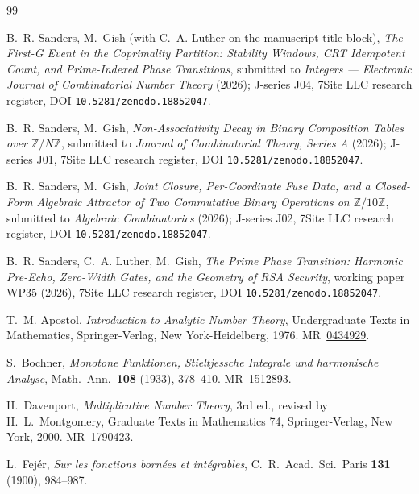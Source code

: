 \documentclass[11pt,reqno]{amsart}
\theoremstyle{plain}
\theoremstyle{definition}
\theoremstyle{remark}
\newcommand{\Z}{\mathbb{Z}}
\begin{document}
\begin{thebibliography}{99}

B.~R. Sanders, M.~Gish (with C.~A. Luther on the manuscript title
block), \emph{The First-G Event in the Coprimality Partition:
Stability Windows, CRT Idempotent Count, and Prime-Indexed Phase
Transitions}, submitted to \emph{Integers --- Electronic Journal of
Combinatorial Number Theory} (2026); J-series J04, 7Site LLC
research register, DOI \texttt{10.5281/zenodo.18852047}.

B.~R. Sanders, M.~Gish, \emph{Non-Associativity Decay in Binary
Composition Tables over $\Z/N\Z$}, submitted to \emph{Journal of
Combinatorial Theory, Series A} (2026); J-series J01, 7Site LLC
research register, DOI \texttt{10.5281/zenodo.18852047}.

B.~R. Sanders, M.~Gish, \emph{Joint Closure, Per-Coordinate Fuse
Data, and a Closed-Form Algebraic Attractor of Two Commutative
Binary Operations on $\Z/10\Z$}, submitted to \emph{Algebraic
Combinatorics} (2026); J-series J02, 7Site LLC research register,
DOI \texttt{10.5281/zenodo.18852047}.

B.~R. Sanders, C.~A. Luther, M.~Gish, \emph{The Prime Phase
Transition: Harmonic Pre-Echo, Zero-Width Gates, and the Geometry
of RSA Security}, working paper WP35 (2026), 7Site LLC research
register, DOI \texttt{10.5281/zenodo.18852047}.

T.~M. Apostol, \emph{Introduction to Analytic Number Theory},
Undergraduate Texts in Mathematics, Springer-Verlag, New York-Heidelberg,
1976.
\textsc{MR}~\href{https://mathscinet.ams.org/mathscinet-getitem?mr=0434929}{0434929}.

S.~Bochner, \emph{Monotone Funktionen, Stieltjessche Integrale und
harmonische Analyse}, Math.\ Ann.\ \textbf{108} (1933), 378--410.
\textsc{MR}~\href{https://mathscinet.ams.org/mathscinet-getitem?mr=1512893}{1512893}.

H.~Davenport, \emph{Multiplicative Number Theory}, 3rd ed., revised
by H.~L.~Montgomery, Graduate Texts in Mathematics 74,
Springer-Verlag, New York, 2000.
\textsc{MR}~\href{https://mathscinet.ams.org/mathscinet-getitem?mr=1790423}{1790423}.

L.~Fej\'er, \emph{Sur les fonctions born\'ees et int\'egrables},
C.~R.~Acad.~Sci.\ Paris \textbf{131} (1900), 984--987.


\end{thebibliography}
\end{document}

